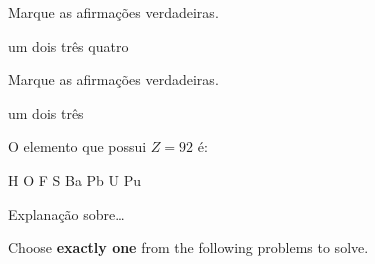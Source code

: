 \documentclass[a4paper,12,addpoints]{exam}
\begin{document}
\begin{multicols}{2}
\begin{questions}
		\question[10] Marque as afirmações verdadeiras.
		\addpoints
		\begin{checkboxes}
			\choice um
			\choice dois
			\choice três
			\choice quatro
		\end{checkboxes}
		
		{%
			\checkboxchar{$\Box$} %
			\question[10] Marque as afirmações verdadeiras.
			\addpoints
			\begin{checkboxes}
				\choice um
				\choice dois
				\choice três 
			\end{checkboxes}
		}%
		
		{%
			\renewcommand*\thechoice{\Roman{choice}} 
			\renewcommand*\choicelabel{(\thechoice)}
			\question[10] O elemento que possui $Z=92$ é:
			\begin{multicols}{3}
				\begin{choices}
					\choice H
					\choice O
					\choice F
					\choice S
					\choice Ba
					\choice Pb
					\choice U
					\choice Pu
				\end{choices}
			\end{multicols}
		}%
		
		
		\question[10]
		Explanação sobre\ldots
		\makeemptybox{2cm}
		
		\question[10] Choose\textbf{ exactly one} from the following problems to solve. 
		



\end{questions}
\end{multicols}
\end{document}
